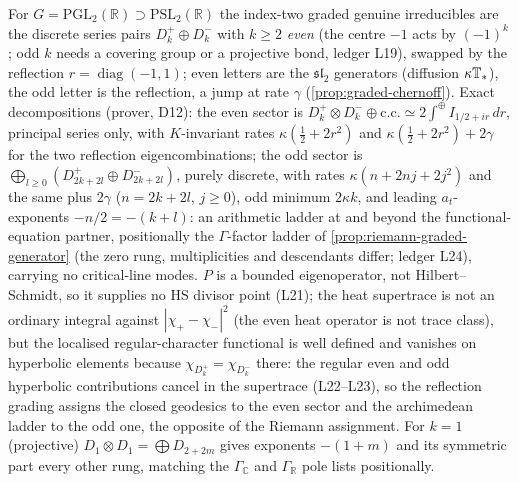 \begin{observation}
\label{obs:graded-continuous-harrow}
For $G = \mathrm{PGL}_2(\mathbb R)\supset\mathrm{PSL}_2(\mathbb R)$ the index-two graded genuine
irreducibles are the discrete series pairs $D_k^+\oplus D_k^-$ with $k\ge2$ \emph{even} (the centre
$-1$ acts by $(-1)^k$; odd $k$ needs a covering group or a projective bond, ledger L19), swapped by
the reflection $r = \operatorname{diag}(-1,1)$; even letters are the $\mathfrak{sl}_2$ generators
(diffusion $\kappa\mathbb T_*$), the odd letter is the reflection, a jump at rate $\gamma$
(\cref{prop:graded-chernoff}). Exact decompositions (prover, D12): the even sector is
$D_k^+\otimes D_k^-\oplus\mathrm{c.c.}\simeq2\int^\oplus I_{1/2+ir}\,dr$, principal series only, with
$K$-invariant rates $\kappa(\tfrac12+2r^2)$ and $\kappa(\tfrac12+2r^2)+2\gamma$ for the two
reflection eigencombinations; the odd sector is $\bigoplus_{l\ge0}(D_{2k+2l}^+\oplus
D_{2k+2l}^-)$, purely discrete, with rates $\kappa(n+2nj+2j^2)$ and the same plus $2\gamma$
($n = 2k+2l$, $j\ge0$), odd minimum $2\kappa k$, and leading $a_t$-exponents $-n/2 = -(k+l)$:
an arithmetic ladder at and beyond the functional-equation partner, positionally the
$\Gamma$-factor ladder of \cref{prop:riemann-graded-generator} (the zero rung, multiplicities and
descendants differ; ledger L24), carrying no critical-line modes. $P$ is a bounded eigenoperator,
not Hilbert--Schmidt, so it supplies no HS divisor point (L21); the heat supertrace is not an
ordinary integral against $|\chi_+-\chi_-|^2$ (the even heat operator is not trace class), but the
localised regular-character functional is well defined and vanishes on hyperbolic elements because
$\chi_{D_k^+} = \chi_{D_k^-}$ there: the regular even and odd hyperbolic contributions cancel in
the supertrace (L22--L23), so the reflection grading assigns the closed geodesics to the even
sector and the archimedean ladder to the odd one, the opposite of the Riemann assignment. For
$k = 1$ (projective) $D_1\otimes D_1 = \bigoplus D_{2+2m}$ gives exponents $-(1+m)$ and its symmetric
part every other rung, matching the $\Gamma_{\mathbb C}$ and $\Gamma_{\mathbb R}$ pole lists
positionally.
\end{observation}

